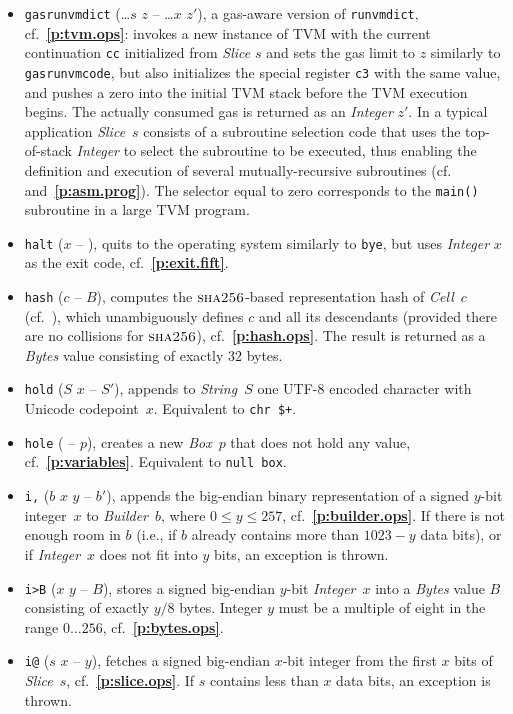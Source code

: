 \documentclass[12pt,oneside]{article}
\def\refpoint#1{{\rm\textbf{\ref{#1}}}}
\let\ptref=\refpoint
\def\opsc#1{\operatorname{\textsc{#1}}}
\def\Sha{\opsc{sha256}}
\begin{document}
\begin{itemize}
\item {\tt gasrunvmdict} (\dots $s$ $z$ -- \dots $x$ $z'$), a gas-aware version of {\tt runvmdict}, cf.~\ptref{p:tvm.ops}: invokes a new instance of TVM with the current continuation {\tt cc} initialized from {\em Slice\/} $s$ and sets the gas limit to $z$ similarly to {\tt gasrunvmcode}, but also initializes the special register {\tt c3} with the same value, and pushes a zero into the initial TVM stack before the TVM execution begins. The actually consumed gas is returned as an {\em Integer\/} $z'$. In a typical application {\em Slice\/}~$s$ consists of a subroutine selection code that uses the top-of-stack {\em Integer\/} to select the subroutine to be executed, thus enabling the definition and execution of several mutually-recursive subroutines (cf.~\cite[4.6]{TVM} and~\ptref{p:asm.prog}). The selector equal to zero corresponds to the {\tt main()} subroutine in a large TVM program.
\item {\tt halt} ($x$ -- ), quits to the operating system similarly to {\tt bye}, but uses {\em Integer\/} $x$ as the exit code, cf.~\ptref{p:exit.fift}.
\item {\tt hash} ($c$ -- $B$), computes the $\Sha$-based representation hash of {\em Cell\/}~$c$ (cf.~\cite[3.1]{TVM}), which unambiguously defines $c$ and all its descendants (provided there are no collisions for $\Sha$), cf.~\ptref{p:hash.ops}. The result is returned as a {\em Bytes\/} value consisting of exactly 32 bytes.
\item {\tt hold} ($S$ $x$ -- $S'$), appends to {\em String\/}~$S$ one UTF-8 encoded character with Unicode codepoint~$x$. Equivalent to {\tt chr \$+}.
\item {\tt hole} ( -- $p$), creates a new {\em Box\/}~$p$ that does not hold any value, cf.~\ptref{p:variables}. Equivalent to {\tt null box}.
\item {\tt i,} ($b$ $x$ $y$ -- $b'$), appends the big-endian binary representation of a signed $y$-bit integer~$x$ to {\em Builder\/}~$b$, where $0\leq y\leq 257$, cf.~\ptref{p:builder.ops}. If there is not enough room in $b$ (i.e., if $b$ already contains more than $1023-y$ data bits), or if {\em Integer\/}~$x$ does not fit into $y$ bits, an exception is thrown.
\item {\tt i>B} ($x$ $y$ -- $B$), stores a signed big-endian $y$-bit {\em Integer\/}~$x$ into a {\em Bytes\/} value $B$ consisting of exactly $y/8$ bytes. Integer $y$ must be a multiple of eight in the range $0\ldots256$, cf.~\ptref{p:bytes.ops}.
\item {\tt i@} ($s$ $x$ -- $y$), fetches a signed big-endian $x$-bit integer from the first $x$ bits of {\em Slice}~$s$, cf.~\ptref{p:slice.ops}. If $s$ contains less than $x$ data bits, an exception is thrown.

\end{itemize}
\end{document}

